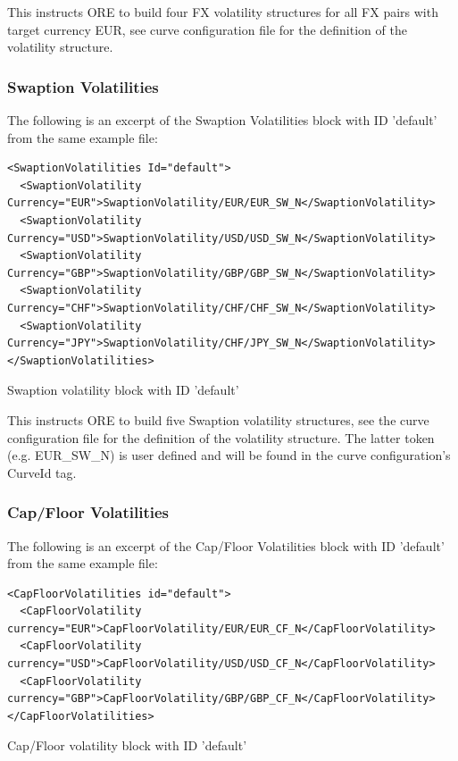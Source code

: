 \documentclass[12pt, a4paper]{article}
\begin{document}
{This instructs ORE to build four FX volatility structures for all FX pairs with target currency EUR, see curve
configuration file for the definition of the volatility structure.

\subsubsection{Swaption Volatilities}

The following is an excerpt of the Swaption Volatilities block with ID 'default' from the same example file:

\begin{listing}[H]
\begin{verbatim}
<SwaptionVolatilities Id="default">
  <SwaptionVolatility Currency="EUR">SwaptionVolatility/EUR/EUR_SW_N</SwaptionVolatility>
  <SwaptionVolatility Currency="USD">SwaptionVolatility/USD/USD_SW_N</SwaptionVolatility>
  <SwaptionVolatility Currency="GBP">SwaptionVolatility/GBP/GBP_SW_N</SwaptionVolatility>
  <SwaptionVolatility Currency="CHF">SwaptionVolatility/CHF/CHF_SW_N</SwaptionVolatility>
  <SwaptionVolatility Currency="JPY">SwaptionVolatility/CHF/JPY_SW_N</SwaptionVolatility>
</SwaptionVolatilities>
\end{verbatim}
\caption{Swaption volatility block with ID 'default'}
\label{lst:swaptionvol_spec}
\end{listing}

This instructs ORE to build five Swaption volatility structures, see the curve configuration file for the definition of
the volatility structure. The latter token (e.g. EUR\_SW\_N) is user defined and will be found in the curve
configuration's CurveId tag.

\subsubsection{Cap/Floor Volatilities}

The following is an excerpt of the Cap/Floor Volatilities block with ID 'default' from the same example file:

\begin{listing}[H]
\begin{verbatim}
<CapFloorVolatilities id="default">
  <CapFloorVolatility currency="EUR">CapFloorVolatility/EUR/EUR_CF_N</CapFloorVolatility>
  <CapFloorVolatility currency="USD">CapFloorVolatility/USD/USD_CF_N</CapFloorVolatility>
  <CapFloorVolatility currency="GBP">CapFloorVolatility/GBP/GBP_CF_N</CapFloorVolatility>
</CapFloorVolatilities>
\end{verbatim}
\caption{Cap/Floor volatility block with ID 'default'}
\label{lst:capfloorvol_spec}
\end{listing}

}
\end{document}
